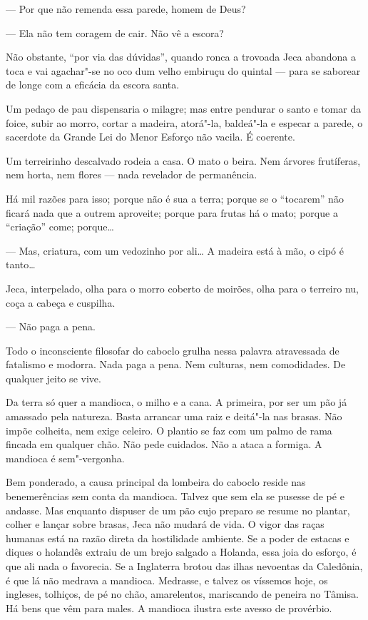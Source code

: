 --- Por que não remenda essa parede, homem de Deus?

--- Ela não tem coragem de cair. Não vê a escora?

Não obstante, ``por via das dúvidas'', quando ronca a trovoada Jeca
abandona a toca e vai agachar"-se no oco dum velho embiruçu do quintal
--- para se saborear de longe com a eficácia da escora santa.

Um pedaço de pau dispensaria o milagre; mas entre pendurar o santo e
tomar da foice, subir ao morro, cortar a madeira, atorá"-la, baldeá"-la e
especar a parede, o sacerdote da Grande Lei do Menor Esforço não vacila.
É coerente.

Um terreirinho descalvado rodeia a casa. O mato o beira. Nem árvores
frutíferas, nem horta, nem flores --- nada revelador de permanência.

Há mil razões para isso; porque não é sua a terra; porque se o
``tocarem'' não ficará nada que a outrem aproveite; porque para frutas
há o mato; porque a ``criação'' come; porque\ldots{}

--- Mas, criatura, com um vedozinho por ali\ldots{} A madeira está à mão, o
cipó é tanto\ldots{}

Jeca, interpelado, olha para o morro coberto de moirões, olha para o
terreiro nu, coça a cabeça e cuspilha.

--- Não paga a pena.

Todo o inconsciente filosofar do caboclo grulha nessa palavra
atravessada de fatalismo e modorra. Nada paga a pena. Nem culturas, nem
comodidades. De qualquer jeito se vive.

Da terra só quer a mandioca, o milho e a cana. A primeira, por ser um
pão já amassado pela natureza. Basta arrancar uma raiz e deitá"-la nas
brasas. Não impõe colheita, nem exige celeiro. O plantio se faz com um
palmo de rama fincada em qualquer chão. Não pede cuidados. Não a ataca a
formiga. A mandioca é sem"-vergonha.

Bem ponderado, a causa principal da lombeira do caboclo reside nas
benemerências sem conta da mandioca. Talvez que sem ela se pusesse de pé
e andasse. Mas enquanto dispuser de um pão cujo preparo se resume no
plantar, colher e lançar sobre brasas, Jeca não mudará de vida. O vigor
das raças humanas está na razão direta da hostilidade ambiente. Se a
poder de estacas e diques o holandês extraiu de um brejo salgado a
Holanda, essa joia do esforço, é que ali nada o favorecia. Se a
Inglaterra brotou das ilhas nevoentas da Caledônia, é que lá não medrava
a mandioca. Medrasse, e talvez os víssemos hoje, os ingleses, tolhiços,
de pé no chão, amarelentos, mariscando de peneira no Tâmisa. Há bens que
vêm para males. A mandioca ilustra este avesso de provérbio.

